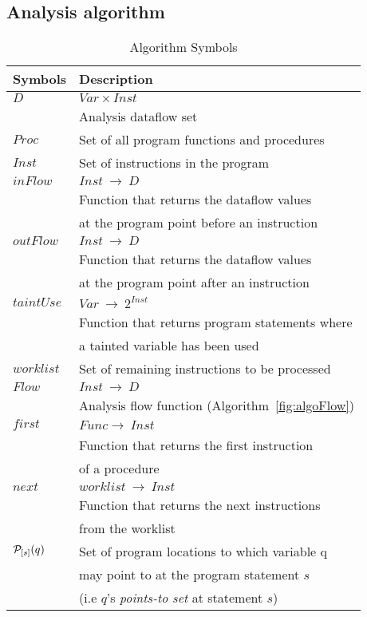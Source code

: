 \subsection{Analysis algorithm} 
\begin{table}
\begin{tabular}{|l|l|}
\hline
\textbf{Symbols}	&	\textbf{Description}							\\ \hline
$\mathit{D}$		&	$\mathit{Var} \times \mathit{Inst}$		\\
					&	Analysis dataflow set 							\\ \hline
$\mathit{Proc}$		&	Set of all program functions and procedures 	\\ \hline
$\mathit{Inst}$		&	Set of instructions in the program 				\\ \hline
$\mathit{inFlow}$	&	$\mathit{Inst}\ \rightarrow\ \mathit{D}$ 		\\
					&	Function that returns the dataflow values		\\
		    		&	at the program point before an instruction 		\\ 	\hline
$\mathit{outFlow}$	&	$\mathit{Inst}\ \rightarrow\ \mathit{D}$ 		\\
					&	Function that returns the dataflow values		\\
		    		&	at the program point after an instruction 		\\ 	\hline
$\mathit{taintUse}$	&	$\mathit{Var}\ \rightarrow\ 2^{Inst}$ 				\\
					&	Function that returns program statements where	\\
		    		&	a tainted variable has been used	 			\\ 	\hline		    		
$\mathit{worklist}$	&	Set of remaining instructions to be processed 	\\ \hline
$\mathit{Flow}$		&	$\mathit{Inst}\ \rightarrow\ \mathit{D}$ 		\\
					&   Analysis flow function (Algorithm~\ref{fig:algoFlow}) 			\\ \hline
$\mathit{first}$	&	$\mathit{Func} \rightarrow\ \mathit{Inst}$ 		\\
					& 	Function that returns the first instruction		\\
					&	of a procedure									\\ \hline
$\mathit{next}$		&	$\mathit{worklist}\ \rightarrow\ \mathit{Inst}$ \\
					& 	Function that returns the next instructions		\\
					&	from the worklist								\\ \hline
$\mathcal{P}_{[s]}(q)$	&	Set of program locations to which variable q	\\
					&	may point to at the program statement $s$		\\
					& 	(i.e $q$'s \textit{points-to set} at statement $s$)	\\ \hline					
\end{tabular}
\caption{Algorithm Symbols}\label{symTable}
\end{table}

